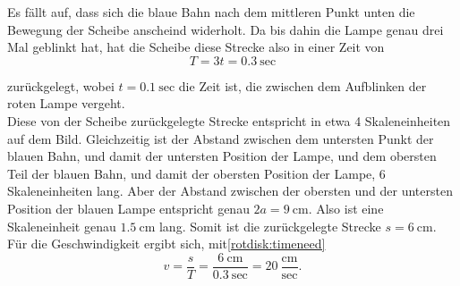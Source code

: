 \begin{Answer}[ref = rotdisk]
	Es fällt auf, dass sich die blaue Bahn nach dem mittleren Punkt unten die Bewegung der Scheibe anscheind widerholt. Da bis dahin die Lampe genau drei Mal geblinkt hat, hat die Scheibe diese Strecke also in einer Zeit von 
	\begin{equation}\label{rotdisk:timeneed}
	T = 3t =0.3~\mathrm{sec}
	\end{equation}
	
	zurückgelegt, wobei $t = 0.1~\mathrm{sec}$ die Zeit ist, die zwischen dem Aufblinken der roten Lampe vergeht.\\
	Diese von der Scheibe zurückgelegte Strecke entspricht in etwa 4 Skaleneinheiten auf dem Bild. Gleichzeitig ist der Abstand zwischen dem untersten Punkt der blauen Bahn, und damit der untersten Position der Lampe, und dem obersten Teil der blauen Bahn, und damit der obersten Position der Lampe, 6 Skaleneinheiten lang. Aber der Abstand zwischen der obersten und der untersten Position der blauen Lampe entspricht genau $2a = 9~\mathrm{cm}$. Also ist eine Skaleneinheit genau $1.5~\mathrm{cm}$ lang. Somit ist die zurückgelegte Strecke $s = 6~\mathrm{cm}$. Für die Geschwindigkeit ergibt sich, mit\eqref{rotdisk:timeneed}
	\begin{equation}
	v = \frac{s}{T} =  \frac{6~\mathrm{cm}}{0.3~\mathrm{sec}} = 20~\mathrm{\frac{cm}{sec}}.
	\end{equation}
\end{Answer}